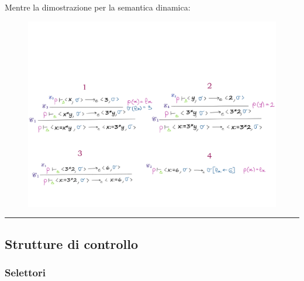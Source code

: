 \documentclass[a4paper]{article}
\newcommand{\longline}{\noindent\rule{\textwidth}{0.4pt}}
\begin{document}
 	\noindent
 	Mentre la dimostrazione per la semantica dinamica:
 	\begin{figure}[!htp]
 		\centering
 		\includegraphics[width=\textwidth]{img/esempio_assegnamento_sem-dinamica.pdf}
 	\end{figure}
 	
 	\longline
 	
 	\subsection{Strutture di controllo}
 	
 	\subsubsection{Selettori}
 	
\end{document}
